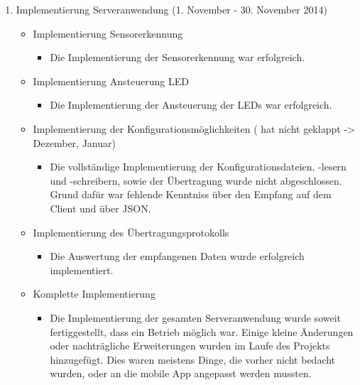 \begin{enumerate}
\item Implementierung Serveranwendung (1. November - 30. November 2014)
\begin{itemize}
\item Implementierung Sensorerkennung
\begin{itemize}
\item Die Implementierung der Sensorerkennung war erfolgreich.
\end{itemize}
\item Implementierung Ansteuerung LED
\begin{itemize}
\item Die Implementierung der Ansteuerung der LEDs war erfolgreich.
\end{itemize}
\item Implementierung der Konfigurationsmöglichkeiten ( hat nicht geklappt -> Dezember, Januar)
\begin{itemize}
\item Die vollständige Implementierung der Konfigurationsdateien, -lesern und -schreibern, sowie der Übertragung wurde nicht abgeschlossen. Grund dafür war fehlende Kenntniss über den Empfang auf dem Client und über JSON.
\end{itemize}
\item Implementierung des Übertragungsprotokolls
\begin{itemize}
\item Die Auswertung der empfangenen Daten wurde erfolgreich implementiert. 
\end{itemize}
\item Komplette Implementierung 
\begin{itemize}
\item Die Implementierung der gesamten Serveranwendung wurde soweit fertiggestellt, dass ein Betrieb möglich war. Einige kleine Änderungen oder nachträgliche Erweiterungen wurden im Laufe des Projekts hinzugefügt. Dies waren meistens Dinge, die vorher nicht bedacht wurden, oder an die mobile App angepasst werden mussten.
\end{itemize}
\end{itemize}


\end{enumerate}
